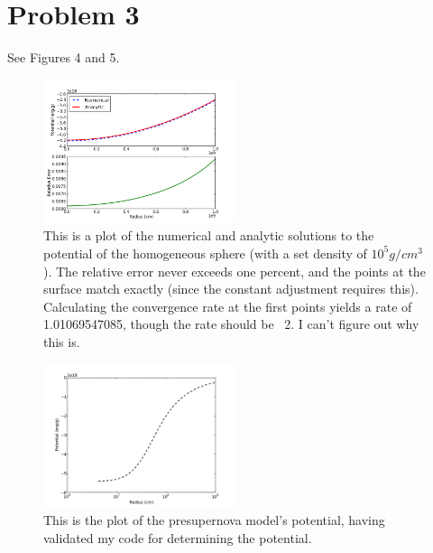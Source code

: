 \documentclass[11pt,letterpaper]{article}
\begin{document}
\section*{Problem 3}

See Figures 4 and 5.

\begin{figure}[bth]
\centering
\includegraphics[width=0.5\textwidth]{Homogeneous}
\caption{This is a plot of the numerical and analytic solutions to the potential of the homogeneous sphere (with a set density of $10^5 g/cm^3$). The relative error never exceeds one percent, and the points at the surface match exactly (since the constant adjustment requires this). Calculating the convergence rate at the first points yields a rate of 1.01069547085, though the rate should be ~2. I can't figure out why this is.}
\label{fig:simpleplot}
\end{figure}

\begin{figure}[bth]
\centering
\includegraphics[width=0.5\textwidth]{Presupernova}
\caption{This is the plot of the presupernova model's potential, having validated my code for determining the potential.}
\label{fig:simpleplot}
\end{figure}
\end{document}
